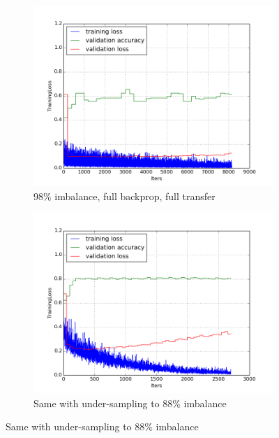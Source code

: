 \documentclass[a4paper,11pt]{article}
\begin{document}
\begin{figure}
    \centering
    \begin{minipage}[b]{\textwidth}
      \begin{subfigure}{.5\textwidth} 
        \centering
        \includegraphics[scale=0.4]{images/plot_clampdetCI98_none_bs128_lr4.png}
        \caption{98\% imbalance, full backprop, full transfer}\label{fig:2a}
      \end{subfigure}%
      \begin{subfigure}{.5\textwidth} 
        \centering
        \includegraphics[scale=0.4]{images/plot_clampdetCI98_us_none_bs128_lr4.png}
        \caption{Same with under-sampling to 88\% imbalance}\label{fig:2b}
      \end{subfigure} \par \vspace*{20pt} %
    \end{minipage}%
    \label{f50}
\end{figure}
\end{document}
